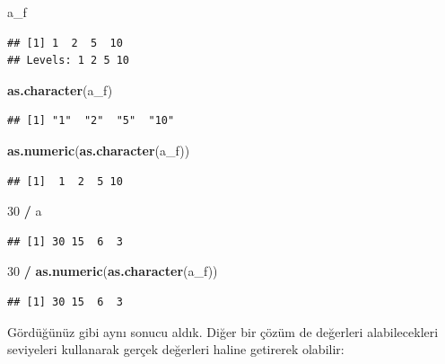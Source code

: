 \documentclass[
]{book}
\newenvironment{Shaded}{\begin{snugshade}}{\end{snugshade}}
\newcommand{\DecValTok}[1]{\textcolor[rgb]{0.00,0.00,0.81}{#1}}
\newcommand{\KeywordTok}[1]{\textcolor[rgb]{0.13,0.29,0.53}{\textbf{#1}}}
\newcommand{\NormalTok}[1]{#1}
\newcommand{\OperatorTok}[1]{\textcolor[rgb]{0.81,0.36,0.00}{\textbf{#1}}}
\newcommand{\StringTok}[1]{\textcolor[rgb]{0.31,0.60,0.02}{#1}}
\begin{document}
\begin{Shaded}
\begin{Highlighting}[]
\NormalTok{a\_f}
\end{Highlighting}
\end{Shaded}

\begin{verbatim}
## [1] 1  2  5  10
## Levels: 1 2 5 10
\end{verbatim}

\begin{Shaded}
\begin{Highlighting}[]
\KeywordTok{as.character}\NormalTok{(a\_f)}
\end{Highlighting}
\end{Shaded}

\begin{verbatim}
## [1] "1"  "2"  "5"  "10"
\end{verbatim}

\begin{Shaded}
\begin{Highlighting}[]
\KeywordTok{as.numeric}\NormalTok{(}\KeywordTok{as.character}\NormalTok{(a\_f))}
\end{Highlighting}
\end{Shaded}

\begin{verbatim}
## [1]  1  2  5 10
\end{verbatim}

\begin{Shaded}
\begin{Highlighting}[]
\DecValTok{30} \OperatorTok{/}\StringTok{ }\NormalTok{a }
\end{Highlighting}
\end{Shaded}

\begin{verbatim}
## [1] 30 15  6  3
\end{verbatim}

\begin{Shaded}
\begin{Highlighting}[]
\DecValTok{30} \OperatorTok{/}\StringTok{ }\KeywordTok{as.numeric}\NormalTok{(}\KeywordTok{as.character}\NormalTok{(a\_f))}
\end{Highlighting}
\end{Shaded}

\begin{verbatim}
## [1] 30 15  6  3
\end{verbatim}

Gördüğünüz gibi aynı sonucu aldık. Diğer bir çözüm de değerleri alabilecekleri seviyeleri kullanarak gerçek değerleri haline getirerek olabilir:
\end{document}
